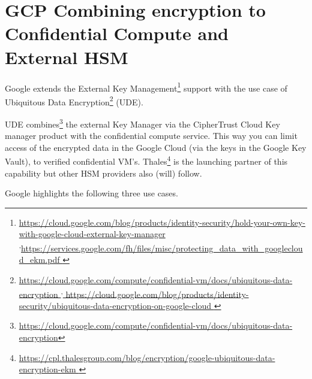 
\section*{GCP Combining encryption to Confidential Compute and External HSM}



Google extends the External Key Management\footnote{\url{https://cloud.google.com/blog/products/identity-security/hold-your-own-key-with-google-cloud-external-key-manager }\textsuperscript{,}\url{https://services.google.com/fh/files/misc/protecting_data_with_googlecloud_ekm.pdf }}
support with the use case of Ubiquitous Data Encryption\footnote{\url{ https://cloud.google.com/compute/confidential-vm/docs/ubiquitous-data-encryption }\textsuperscript{,}\url{ https://cloud.google.com/blog/products/identity-security/ubiquitous-data-encryption-on-google-cloud  }} (UDE).  

UDE combines\footnote{\url{ https://cloud.google.com/compute/confidential-vm/docs/ubiquitous-data-encryption}} the external Key Manager 
via the CipherTrust Cloud Key manager product 
with the confidential compute service. 
This way you can limit access of the encrypted data in the Google Cloud 
(via the keys in the Google Key Vault), 
to verified confidential VM’s. 
Thales\footnote{\url{https://cpl.thalesgroup.com/blog/encryption/google-ubiquitous-data-encryption-ekm }} 
is the launching partner of this capability 
but other HSM providers also (will) follow.

Google highlights the following three use cases.

